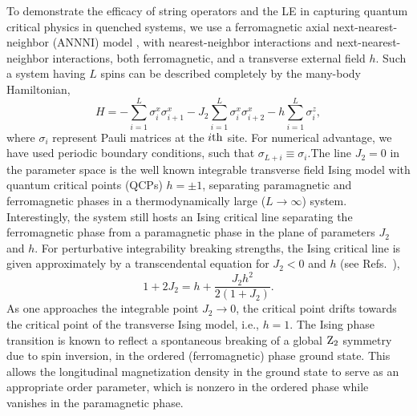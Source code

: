 \documentclass[aps,prx,twocolumn]{revtex4-2}
\begin{document}
To demonstrate the efficacy of string operators and the LE in capturing quantum critical physics in quenched systems, we use  a ferromagnetic axial next-nearest-neighbor  {(ANNNI) model} \cite{dutta15_book}, with nearest-neighbor interactions and next-nearest-neighbor interactions, both ferromagnetic,  and a  {transverse} external field $h$. Such a system having $L$ spins can be described completely by the many-body Hamiltonian,
\begin{equation}\label{eq:ham}
H=-\sum\limits_{i=1}^{L}\sigma^x_i\sigma^x_{i+1}-J_2\sum\limits_{i=1}^{L}\sigma^x_i\sigma^x_{i+2}-h\sum\limits_{i=1}^{L}\sigma^z_i,
\end{equation}
where $\sigma_i$ represent Pauli matrices at the ${\rm} i{\rm th}$ site. For numerical advantage, we have used periodic boundary conditions, such that $\sigma_{L+i}\equiv\sigma_{i}$.The line $J_2=0$ in the parameter space is the well known integrable transverse field Ising model with quantum critical points  {(QCPs)} $h=\pm 1$, separating paramagnetic and ferromagnetic phases in a thermodynamically large ($L\rightarrow\infty$) system. Interestingly, the system still hosts an Ising critical line separating the ferromagnetic phase from a paramagnetic phase in the plane of parameters $J_2$ and $h$. For perturbative integrability breaking strengths, the Ising critical line is given approximately by a transcendental equation for $J_2<0$ and $h$ (see  {Refs}.~\cite{matteo06,karrasch13}),
\begin{equation}\label{eq:nonin_qcp}
1+2J_2=h+\frac{J_2h^2}{2\left(1+J_2\right)}.
\end{equation}
As one approaches the integrable point $J_2\rightarrow 0$, the critical point drifts towards the critical point of the transverse Ising model, i.e., $h=1$. The Ising phase transition is known to reflect a spontaneous breaking of a global ${\rm Z}_2$ symmetry  {due to spin inversion}, in the ordered (ferromagnetic) phase ground state. This allows the longitudinal magnetization density in the ground state to serve as an appropriate order parameter, which is nonzero in the ordered phase while vanishes in the paramagnetic phase.\\
\end{document}
